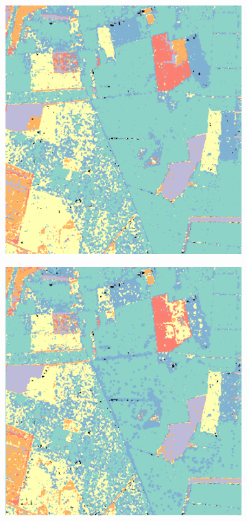 \begin{figure}[t]
\begin{subfigure}[b]{0.23\textwidth}
		\caption{}
		\label{fig:C}
	\end{subfigure}
	\begin{subfigure}[b]{0.23\textwidth}
		\includegraphics[width=\textwidth]{Figures/Kron/Review/C+L_RAW+COLOUR_CROP_MASK}
		\caption{}
		\label{fig:L}
	\end{subfigure}
	\begin{subfigure}[b]{0.23\textwidth}
		\includegraphics[width=\textwidth]{Figures/Kron/Review/L_COLOUR_PR_CROP_MASK}

\end{subfigure}
\end{figure}
